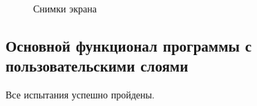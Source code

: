 \documentclass[a4paper, 12pt]{article}
\begin{document}
	\begin{figure}[htbp]
		\centering
		\caption{Снимки экрана}
	\end{figure}
	\subsection{Основной функционал программы с пользовательскими слоями}
	Все испытания успешно пройдены.
\end{document}
